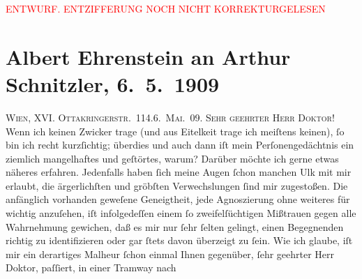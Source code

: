 
\begin{center}
            \textcolor{red}{ENTWURF. ENTZIFFERUNG NOCH NICHT KORREKTURGELESEN}
                      \end{center}
            
               \section[Albert Ehrenstein an Arthur Schnitzler, 6. 5. 1909]{ Albert Ehrenstein an Arthur Schnitzler, 6. 5. 1909}\nopagebreak{}\rehead{ }\begin{ledgroupsized}[t]{13cm}\normalsize\beginnumbering{} \toendnotes[C]{\smallbreak\pagebreak[2]} 
\toendnotes[C]{\smallbreak}\pstart
           {\pb}\textsc{Wien, XVI. Ottakringerstr. 114}.\hfill \textsc{6. Mai. 09}.\pend
           \pstart{}\textsc{Sehr geehrter Herr Doktor!}\pend\pstart
           Wenn ich keinen Zwicker trage (und aus Eitelkeit trage ich meiſtens keinen), ſo
                    bin ich recht kurzſichtig; überdies und auch dann iſt mein Perſonengedächtnis
                    ein ziemlich mangelhaftes und geſtörtes, warum? Darüber möchte ich gerne etwas
                    näheres erfahren. Jedenfalls haben ſich meine Augen ſchon manchen Ulk mit mir
                    erlaubt, die ärgerlichſten und gröbſten Verwechslungen ſind mir zugestoßen. Die
                    anfänglich vorhanden geweſene Geneigtheit, jede Agnoszierung ohne weiteres für
                    wichtig anzuſehen, iſt infolgedeſſen einem ſo zweifelſüchtigen Mißtrauen gegen
                    alle Wahrnehmung gewichen, daß es mir nur ſehr ſelten gelingt, einen Begegnenden
                    richtig zu identifizieren oder gar ſtets davon überzeigt zu ſein. Wie ich
                    glaube, iſt mir ein derartiges Malheur ſchon einmal Ihnen gegenüber, ſehr
                    geehrter \introOben{}Herr\introOben{} Doktor, paſſiert, in einer Tramway nach

\end{ledgroupsized}
